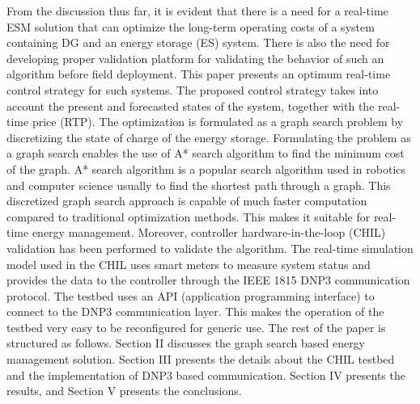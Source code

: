 From the discussion thus far, it is evident that there is a need for a real-time ESM solution that can optimize the long-term operating costs of a system containing DG and an energy storage (ES) system. There is also the need for developing proper validation platform for validating the behavior of such an algorithm before field deployment.  This paper presents an optimum real-time control strategy for such systems. The proposed control strategy takes into account the present and forecasted states of the system, together with the real-time price (RTP). The optimization is formulated as a graph search problem by discretizing the state of charge of the energy storage. Formulating the problem as a graph search enables the use of A* search algorithm to find the minimum cost of the graph. A* search algorithm is a popular search algorithm used in robotics and computer science usually to find the shortest path through a graph. This discretized graph search approach is capable of much faster computation compared to traditional optimization methods. This makes it suitable for real-time energy management.
Moreover, controller hardware-in-the-loop (CHIL) validation has been performed to validate the algorithm. The real-time simulation model used in the CHIL uses smart meters to measure system status and provides the data to the controller through the IEEE 1815 DNP3 communication protocol. The testbed uses an API (application programming interface) to connect to the DNP3 communication layer. This makes the operation of the testbed very easy to be reconfigured for generic use. The rest of the paper is structured as follows. Section II discusses the graph search based energy management solution. Section III  presents the details about the CHIL testbed and the implementation of DNP3 based communication. Section IV presents the results, and Section V presents the conclusions.


